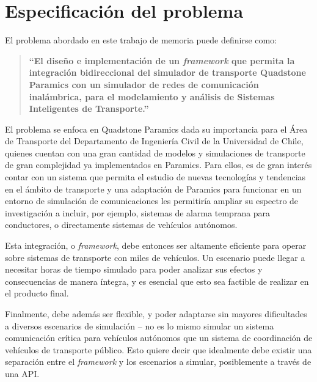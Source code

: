 \section{Especificación del problema}

El problema abordado en este trabajo de memoria puede definirse como: 
\begin{quote}
    \textbf{``El diseño e implementación de un \emph{framework} que permita la integración bidireccional del simulador de transporte Quadstone Paramics con un simulador de redes de comunicación inalámbrica, para el modelamiento y análisis de Sistemas Inteligentes de Transporte.''}
\end{quote}

El problema se enfoca en Quadstone Paramics dada su importancia para el Área de Transporte del Departamento de Ingeniería Civil de la Universidad de Chile, quienes cuentan con una gran cantidad de modelos y simulaciones de transporte de gran complejidad ya implementados en Paramics.
Para ellos, es de gran interés contar con un sistema que permita el estudio de nuevas tecnologías y tendencias en el ámbito de transporte y una adaptación de Paramics para funcionar en un entorno de simulación de comunicaciones les permitiría ampliar su espectro de investigación a incluir, por ejemplo, sistemas de alarma temprana para conductores, o directamente sistemas de vehículos autónomos.

Esta integración, o \emph{framework}, debe entonces ser altamente eficiente para operar sobre sistemas de transporte con miles de vehículos. Un escenario puede llegar a necesitar horas de tiempo simulado para poder analizar sus efectos y consecuencias de manera íntegra, y es esencial que esto sea factible de realizar en el producto final.

Finalmente, debe además ser flexible, y poder adaptarse sin mayores dificultades a diversos escenarios de simulación -- no es lo mismo simular un sistema comunicación crítica para vehículos autónomos que un sistema de coordinación de vehículos de transporte público. Esto quiere decir que idealmente debe existir una separación entre el \emph{framework} y los escenarios a simular, posiblemente a través de una API.